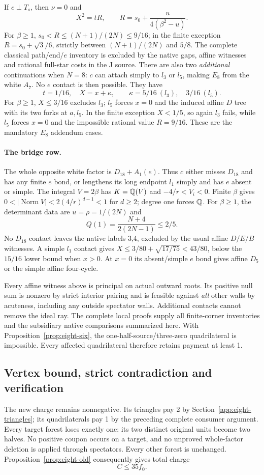 If $c\perp T_s$, then $\nu=0$ and
\[
 X^2=tR,\qquad R=s_0+\frac{u}{4(\beta^2-u)}.
\]
For $\beta\ge1$, $s_0<R\le(N+1)/(2N)\le9/16$; in the
finite exception $R=s_0+\sqrt3/6$, strictly between
$(N+1)/(2N)$ and $5/8$. The complete classical path/end/$e$
inventory is excluded by the native gaps, affine witnesses and
rational full-star costs in the J source. There are also two
\emph{additional} continuations when $N=8$: $c$ can attach
simply to $l_3$ or $l_5$, making $E_8$ from the white $A_7$.
No $e$ contact is then possible. They have
\[
 t=1/16,\quad X=x+\kappa,\qquad
 \kappa=5/16\ (l_3),\quad 3/16\ (l_5).
\]
For $\beta\ge1$, $X\le3/16$ excludes $l_3$; $l_5$ forces
$x=0$ and the induced affine $D$ tree with its two forks at
$a,l_5$. In the finite exception $X<1/5$, so again $l_3$
fails, while $l_5$ forces $x=0$ and the impossible rational
value $R=9/16$. These are the mandatory $E_8$ addendum cases.

\paragraph{The bridge row.}
The whole opposite white factor is $D_{18}+A_1(e)$. Thus $c$
either misses $D_{18}$ and has any finite $e$ bond, or lengthens
its long endpoint $l_1$ simply and has $e$ absent or simple.
The integral $V=2\beta$ has $K=\mathbb Q(V)$ and
$-4/r<V_i<0$. Finite $\beta$ gives
$0<|\operatorname{Norm}V|<2(4/r)^{d-1}<1$ for $d\ge2$;
degree one forces $\mathbb Q$. For $\beta\ge1$, the determinant
data are $u=\rho=1/(2N)$ and
\[
 Q(1)=\frac{N+4}{2(2N-1)}\le2/5.
\]
No $D_{18}$ contact leaves the native labels 3,4, excluded by
the usual affine $D/E/B$ witnesses. A simple $l_1$ contact gives
$X\le3/80+\sqrt{17/75}<43/80$, below the $15/16$ lower
bound when $x>0$. At $x=0$ its absent/simple $e$ bond gives
affine $D_5$ or the simple affine four-cycle.

Every affine witness above is principal on actual outward roots.
Its positive null sum is nonzero by strict interior pairing and
is feasible against \emph{all} other walls by acuteness, including
any outside spectator walls. Additional contacts cannot remove
the ideal ray. The complete local proofs supply all finite-corner
inventories and the subsidiary native comparisons summarized here.
With Proposition~\ref{prop:eight-six}, the one-half-source/three-zero
quadrilateral is impossible. Every affected quadrilateral therefore
retains payment at least 1.

\subsection{Vertex bound, strict contradiction and verification}
The new charge remains nonnegative. Its triangles pay 2 by
Section~\ref{app:eight-triangles}; its quadrilaterals pay 1 by the
preceding complete consumer argument. Every target forest loses
exactly one: its two distinct original units become two halves.
No positive coupon occurs on a target, and no unproved whole-factor
deletion is applied through spectators. Every other forest is unchanged.
Proposition~\ref{prop:eight-old} consequently gives total charge
\begin{equation}\label{eq:eight-upper}
 C\le35 f_0.
\end{equation}

